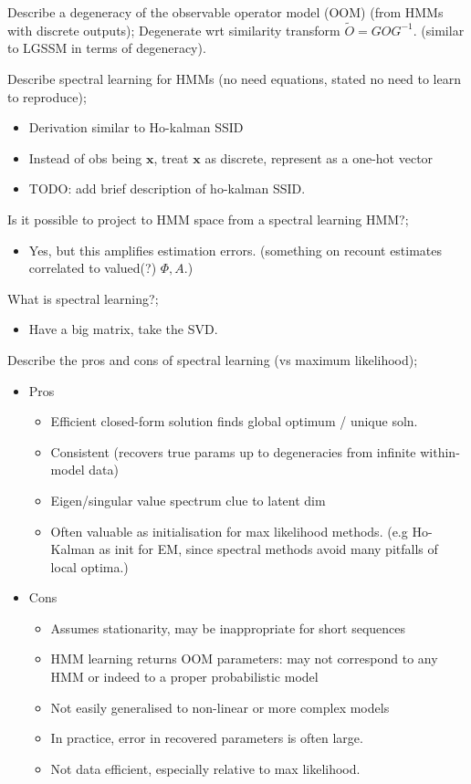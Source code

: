 \documentclass{article}
\begin{document}
Describe a degeneracy of the observable operator model (OOM) (from HMMs with discrete outputs); Degenerate wrt similarity transform $\tilde{O}=GOG^{-1}$. (similar to LGSSM in terms of degeneracy).

Describe spectral learning for HMMs (no need equations, stated no need to learn to reproduce); \begin{itemize} \item Derivation similar to Ho-kalman SSID \item Instead of obs being $\mathbf{x}$, treat $\mathbf{x}$ as discrete, represent as a one-hot vector \item TODO: add brief description of ho-kalman SSID. \end{itemize}

Is it possible to project to HMM space from a spectral learning HMM?; \begin{itemize} \item Yes, but this amplifies estimation errors. (something on recount estimates correlated to valued(?) $\Phi, A$.) \end{itemize} 

What is spectral learning?; \begin{itemize} \item Have a big matrix, take the SVD. \end{itemize}

Describe the pros and cons of spectral learning (vs maximum likelihood); \begin{itemize} \item Pros \begin{itemize} \item Efficient closed-form solution finds global optimum / unique soln. \item Consistent (recovers true params up to degeneracies from infinite within-model data) \item Eigen/singular value spectrum clue to latent dim \item Often valuable as initialisation for max likelihood methods. (e.g Ho-Kalman as init for EM, since spectral methods avoid many pitfalls of local optima.) \end{itemize} \item Cons \begin{itemize} \item Assumes stationarity, may be inappropriate for short sequences \item HMM learning returns OOM parameters: may not correspond to any HMM or indeed to a proper probabilistic model \item Not easily generalised to non-linear or more complex models \item In practice, error in recovered parameters is often large.  \item Not data efficient, especially relative to max likelihood. \end{itemize} \end{itemize}
\end{document}
